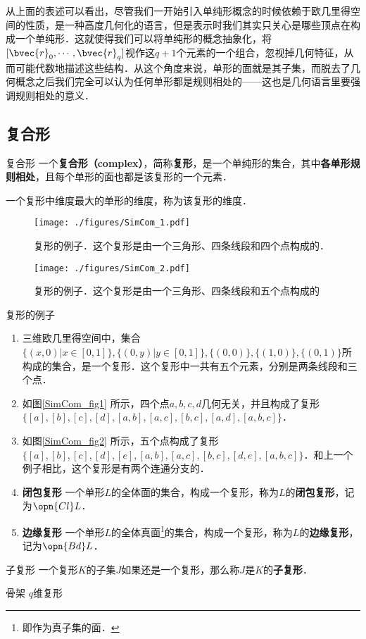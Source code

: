 从上面的表述可以看出，尽管我们一开始引入单纯形概念的时候依赖于欧几里得空间的性质，是一种高度几何化的语言，但是表示时我们其实只关心是哪些顶点在构成一个单纯形．这就使得我们可以将单纯形的概念抽象化，将$[\bvec{r}_0, \cdots, \bvec{r}_q]$视作这$q+1$个元素的一个组合，忽视掉几何特征，从而可能代数地描述这些结构．从这个角度来说，单形的面就是其子集，而脱去了几何概念之后我们完全可以认为任何单形都是规则相处的——这也是几何语言里要强调规则相处的意义．

\subsection{复合形}

\begin{definition}{复合形}
一个\textbf{复合形（complex）}，简称\textbf{复形}，是一个单纯形的集合，其中\textbf{各单形规则相处}，且每个单形的面也都是该复形的一个元素．

一个复形中维度最大的单形的维度，称为该复形的维度．
\end{definition}

\begin{figure}[ht]
\centering
\texttt{[image: ./figures/SimCom\_1.pdf]}
\caption{复形的例子．这个复形是由一个三角形、四条线段和四个点构成的．} \label{SimCom_fig1}
\end{figure}

\begin{figure}[ht]
\centering
\texttt{[image: ./figures/SimCom\_2.pdf]}
\caption{复形的例子．这个复形是由一个三角形、四条线段和五个点构成的} \label{SimCom_fig2}
\end{figure}


\begin{example}{复形的例子}
\begin{enumerate}
\item 三维欧几里得空间中，集合$\{(x, 0)|x\in[0,1]\}, \{(0, y)|y\in[0, 1]\}, \{(0, 0)\}, \{(1, 0)\}, \{(0, 1)\}$所构成的集合，是一个复形．这个复形中一共有五个元素，分别是两条线段和三个点．
\item 如图\autoref{SimCom_fig1} 所示，四个点$a, b, c, d$几何无关，并且构成了复形$\{[a], [b], [c], [d], [a, b], [a, c], [b, c], [a, d], [a, b, c]\}$．
\item 如图\autoref{SimCom_fig2} 所示，五个点构成了复形$\{[a], [b], [c], [d], [e], [a, b], [a, c], [b, c], [d, e], [a, b, c]\}$．和上一个例子相比，这个复形是有两个连通分支的．
\item \textbf{闭包复形} 一个单形$L$的全体面的集合，构成一个复形，称为$L$的\textbf{闭包复形}，记为$\opn{Cl} L$．
\item \textbf{边缘复形} 一个单形$L$的全体真面\footnote{即作为真子集的面．}的集合，构成一个复形，称为$L$的\textbf{边缘复形}，记为$\opn{Bd} L$．
\end{enumerate}
\end{example}

\begin{definition}{子复形}
一个复形$K$的子集$J$如果还是一个复形，那么称$J$是$K$的\textbf{子复形}．
\end{definition}

\begin{definition}{骨架}
$q$维复形
\end{definition}









